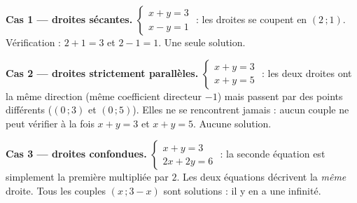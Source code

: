 \documentclass[11pt]{article}
\begin{document}
\begin{exemplebox}
\textbf{Cas 1 — droites sécantes.} $\begin{cases} x + y = 3 \\ x - y = 1 \end{cases}$ : les droites se coupent en $(2\,;1)$. Vérification : $2+1=3$ et $2-1=1$. Une seule solution.

\textbf{Cas 2 — droites strictement parallèles.} $\begin{cases} x + y = 3 \\ x + y = 5 \end{cases}$ : les deux droites ont la même direction (même coefficient directeur $-1$) mais passent par des points différents ($(0\,;3)$ et $(0\,;5)$). Elles ne se rencontrent jamais : aucun couple ne peut vérifier à la fois $x+y=3$ et $x+y=5$. Aucune solution.

\textbf{Cas 3 — droites confondues.} $\begin{cases} x + y = 3 \\ 2x + 2y = 6 \end{cases}$ : la seconde équation est simplement la première multipliée par $2$. Les deux équations décrivent la \emph{même} droite. Tous les couples $(x\,;3-x)$ sont solutions : il y en a une infinité.
\end{exemplebox}
\end{document}
